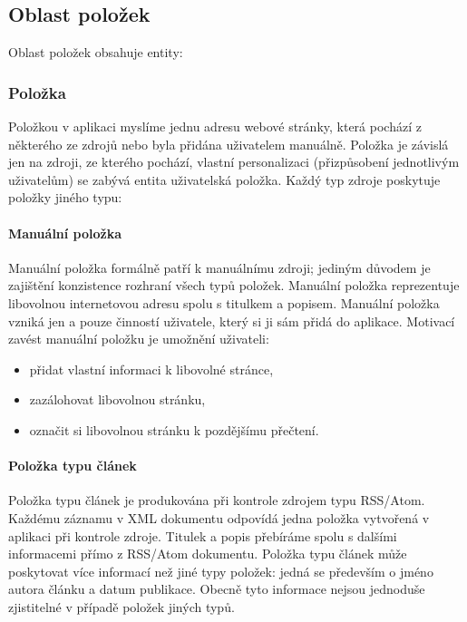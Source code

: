 \subsection{Oblast položek}

Oblast položek obsahuje entity:

\subsubsection{Položka}

Položkou v aplikaci myslíme jednu adresu webové stránky, která pochází z některého ze zdrojů nebo byla přidána uživatelem manuálně.
Položka je závislá jen na zdroji, ze kterého pochází, vlastní personalizaci (přizpůsobení jednotlivým uživatelům) se zabývá entita uživatelská položka.
Každý typ zdroje poskytuje položky jiného typu:

\paragraph{Manuální položka}

Manuální položka formálně patří k manuálnímu zdroji; jediným důvodem je zajištění konzistence rozhraní všech typů položek.
Manuální položka reprezentuje libovolnou internetovou adresu spolu s titulkem a popisem.
Manuální položka vzniká jen a pouze činností uživatele, který si ji sám přidá do aplikace.
Motivací zavést manuální položku je umožnění uživateli:
\begin{itemize}
	\item přidat vlastní informaci k libovolné stránce,
	\item zazálohovat libovolnou stránku,
	\item označit si libovolnou stránku k pozdějšímu přečtení.
\end{itemize}

\paragraph{Položka typu článek}

Položka typu článek je produkována při kontrole zdrojem typu RSS/Atom.
Každému záznamu v XML dokumentu odpovídá jedna položka vytvořená v aplikaci při kontrole zdroje.
Titulek a popis přebíráme spolu s dalšími informacemi přímo z RSS/Atom dokumentu.
Položka typu článek může poskytovat více informací než jiné typy položek: jedná se především o jméno autora článku a datum publikace.
Obecně tyto informace nejsou jednoduše zjistitelné v případě položek jiných typů.

